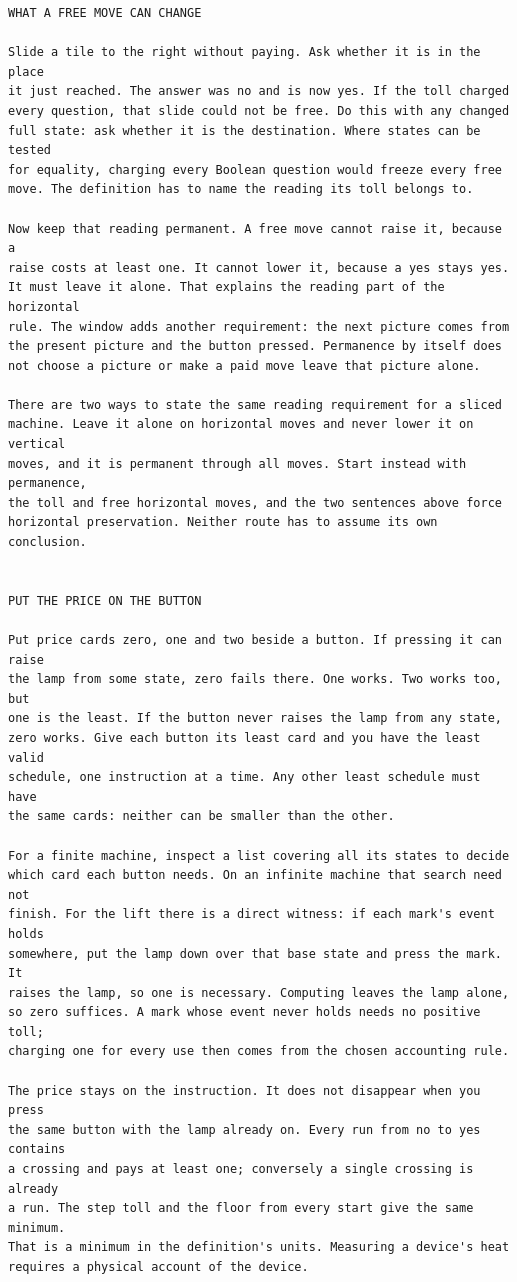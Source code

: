 \documentclass[11pt,twoside]{article}
\theoremstyle{thielethm}
\theoremstyle{thieledef}
\theoremstyle{thieledef}
\theoremstyle{thieledef}
\theoremstyle{thielethm}
\theoremstyle{thieleobs}
\theoremstyle{thielethm}
\begin{document}
\begin{small}\begin{verbatim}
WHAT A FREE MOVE CAN CHANGE

Slide a tile to the right without paying. Ask whether it is in the place
it just reached. The answer was no and is now yes. If the toll charged
every question, that slide could not be free. Do this with any changed
full state: ask whether it is the destination. Where states can be tested
for equality, charging every Boolean question would freeze every free
move. The definition has to name the reading its toll belongs to.

Now keep that reading permanent. A free move cannot raise it, because a
raise costs at least one. It cannot lower it, because a yes stays yes.
It must leave it alone. That explains the reading part of the horizontal
rule. The window adds another requirement: the next picture comes from
the present picture and the button pressed. Permanence by itself does
not choose a picture or make a paid move leave that picture alone.

There are two ways to state the same reading requirement for a sliced
machine. Leave it alone on horizontal moves and never lower it on vertical
moves, and it is permanent through all moves. Start instead with permanence,
the toll and free horizontal moves, and the two sentences above force
horizontal preservation. Neither route has to assume its own conclusion.


PUT THE PRICE ON THE BUTTON

Put price cards zero, one and two beside a button. If pressing it can raise
the lamp from some state, zero fails there. One works. Two works too, but
one is the least. If the button never raises the lamp from any state,
zero works. Give each button its least card and you have the least valid
schedule, one instruction at a time. Any other least schedule must have
the same cards: neither can be smaller than the other.

For a finite machine, inspect a list covering all its states to decide
which card each button needs. On an infinite machine that search need not
finish. For the lift there is a direct witness: if each mark's event holds
somewhere, put the lamp down over that base state and press the mark. It
raises the lamp, so one is necessary. Computing leaves the lamp alone,
so zero suffices. A mark whose event never holds needs no positive toll;
charging one for every use then comes from the chosen accounting rule.

The price stays on the instruction. It does not disappear when you press
the same button with the lamp already on. Every run from no to yes contains
a crossing and pays at least one; conversely a single crossing is already
a run. The step toll and the floor from every start give the same minimum.
That is a minimum in the definition's units. Measuring a device's heat
requires a physical account of the device.



\end{verbatim}
\end{small}
\end{document}
